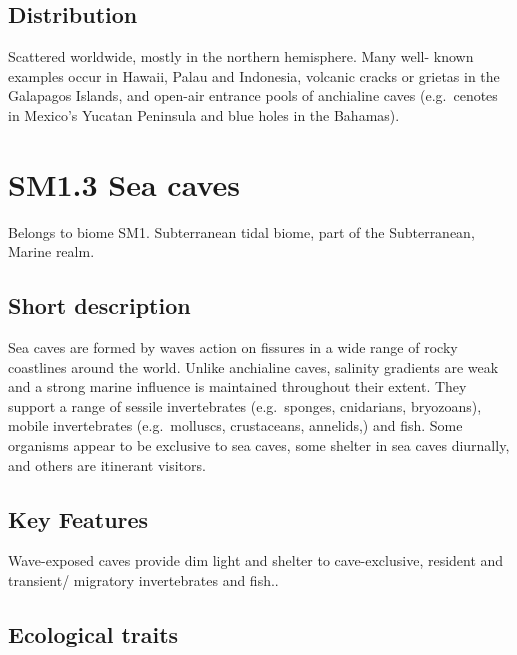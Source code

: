 \documentclass[
  letterpaper,
  DIV=11,
  numbers=noendperiod]{scrartcl}
\begin{document}
\subsection{Distribution}\label{distribution-67}

Scattered worldwide, mostly in the northern hemisphere. Many well- known
examples occur in Hawaii, Palau and Indonesia, volcanic cracks or
grietas in the Galapagos Islands, and open-air entrance pools of
anchialine caves (e.g.~cenotes in Mexico's Yucatan Peninsula and blue
holes in the Bahamas).

\section{SM1.3 Sea caves}\label{sm1.3-sea-caves}

Belongs to biome SM1. Subterranean tidal biome, part of the
Subterranean, Marine realm.

\subsection{Short description}\label{short-description-68}

Sea caves are formed by waves action on fissures in a wide range of
rocky coastlines around the world. Unlike anchialine caves, salinity
gradients are weak and a strong marine influence is maintained
throughout their extent. They support a range of sessile invertebrates
(e.g.~sponges, cnidarians, bryozoans), mobile invertebrates
(e.g.~molluscs, crustaceans, annelids,) and fish. Some organisms appear
to be exclusive to sea caves, some shelter in sea caves diurnally, and
others are itinerant visitors.

\subsection{Key Features}\label{key-features-68}

Wave-exposed caves provide dim light and shelter to cave-exclusive,
resident and transient/ migratory invertebrates and fish..

\subsection{Ecological traits}\label{ecological-traits-68}
\end{document}
